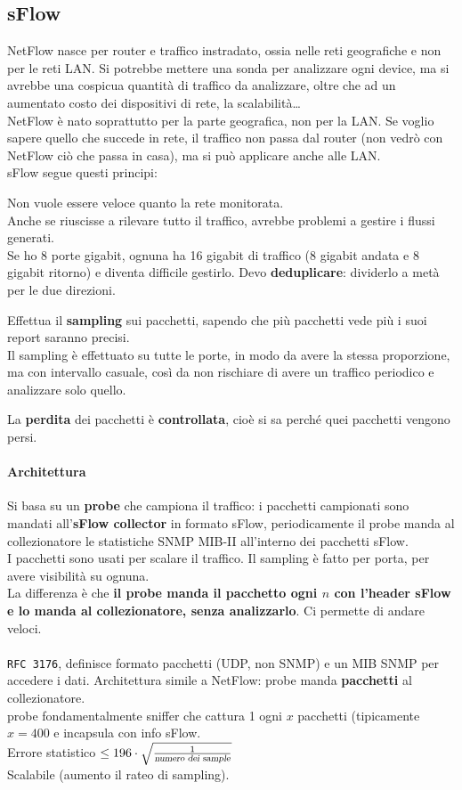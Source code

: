 \documentclass[10pt]{book}
\begin{document}
\subsection{sFlow}
NetFlow nasce per router e traffico instradato, ossia nelle reti geografiche e non per le reti LAN. Si potrebbe mettere una sonda per analizzare ogni device, ma si avrebbe una cospicua quantità di traffico da analizzare, oltre che ad un aumentato costo dei dispositivi di rete, la scalabilità\ldots\\
NetFlow è nato soprattutto per la parte geografica, non per la LAN. Se voglio sapere quello che succede in rete, il traffico non passa dal router (non vedrò con NetFlow ciò che passa in casa), ma si può applicare anche alle LAN.\\
sFlow segue questi principi:
\begin{list}{}{}
	\item Non vuole essere veloce quanto la rete monitorata.\\
	Anche se riuscisse a rilevare tutto il traffico, avrebbe problemi a gestire i flussi generati.\\
	Se ho 8 porte gigabit, ognuna ha 16 gigabit di traffico (8 gigabit andata e 8 gigabit ritorno) e diventa difficile gestirlo. Devo \textbf{deduplicare}: dividerlo a metà per le due direzioni.\\
	\item Effettua il \textbf{sampling} sui pacchetti, sapendo che più pacchetti vede più i suoi report saranno precisi.\\
	Il sampling è effettuato su tutte le porte, in modo da avere la stessa proporzione, ma con intervallo casuale, così da non rischiare di avere un traffico periodico e analizzare solo quello.
	\item La \textbf{perdita} dei pacchetti è \textbf{controllata}, cioè si sa perché quei pacchetti vengono persi.
\end{list}
\paragraph{Architettura} Si basa su un \textbf{probe} che campiona il traffico: i pacchetti campionati sono mandati all'\textbf{sFlow collector} in formato sFlow, periodicamente il probe manda al collezionatore le statistiche SNMP MIB-II all'interno dei pacchetti sFlow.\\
I pacchetti sono usati per scalare il traffico. Il sampling è fatto per porta, per avere visibilità su ognuna.\\
La differenza è che \textbf{il probe manda il pacchetto ogni $n$ con l'header sFlow e lo manda al collezionatore, senza analizzarlo}. Ci permette di andare veloci.\\\\
\texttt{RFC 3176}, definisce formato pacchetti (UDP, non SNMP) e un MIB SNMP per accedere i dati. Architettura simile a NetFlow: probe manda \textbf{pacchetti} al collezionatore.\\
probe fondamentalmente sniffer che cattura 1 ogni $x$ pacchetti (tipicamente $x = 400$ e incapsula con info sFlow.\\
Errore statistico $\leq 196\cdot\sqrt{\frac{1}{\textsl{numero dei sample}}}$\\
Scalabile (aumento il rateo di sampling).
\end{document}
